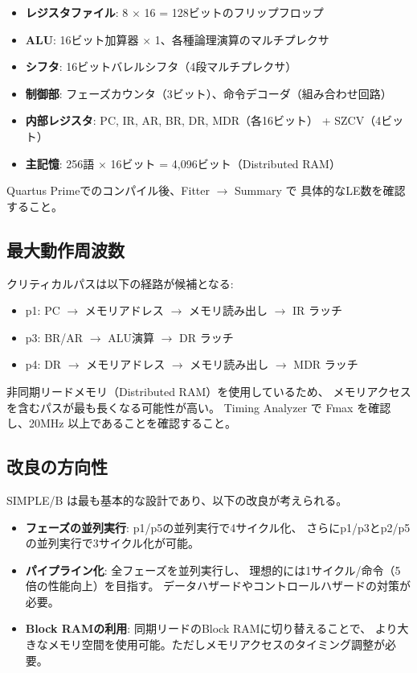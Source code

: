 \documentclass[a4paper,11pt]{ltjsarticle}
\begin{document}
\begin{itemize}
\item \textbf{レジスタファイル}: 8 $\times$ 16 = 128ビットのフリップフロップ
\item \textbf{ALU}: 16ビット加算器 $\times$ 1、各種論理演算のマルチプレクサ
\item \textbf{シフタ}: 16ビットバレルシフタ（4段マルチプレクサ）
\item \textbf{制御部}: フェーズカウンタ（3ビット）、命令デコーダ（組み合わせ回路）
\item \textbf{内部レジスタ}: PC, IR, AR, BR, DR, MDR（各16ビット） + SZCV（4ビット）
\item \textbf{主記憶}: 256語 $\times$ 16ビット = 4,096ビット（Distributed RAM）
\end{itemize}

Quartus Primeでのコンパイル後、Fitter $\rightarrow$ Summary で
具体的なLE数を確認すること。

\subsection{最大動作周波数}

クリティカルパスは以下の経路が候補となる:
\begin{itemize}
\item p1: PC $\rightarrow$ メモリアドレス $\rightarrow$ メモリ読み出し $\rightarrow$ IR ラッチ
\item p3: BR/AR $\rightarrow$ ALU演算 $\rightarrow$ DR ラッチ
\item p4: DR $\rightarrow$ メモリアドレス $\rightarrow$ メモリ読み出し $\rightarrow$ MDR ラッチ
\end{itemize}

非同期リードメモリ（Distributed RAM）を使用しているため、
メモリアクセスを含むパスが最も長くなる可能性が高い。
Timing Analyzer で Fmax を確認し、20MHz 以上であることを確認すること。

\subsection{改良の方向性}

SIMPLE/B は最も基本的な設計であり、以下の改良が考えられる。

\begin{itemize}
\item \textbf{フェーズの並列実行}: p1/p5の並列実行で4サイクル化、
  さらにp1/p3とp2/p5の並列実行で3サイクル化が可能。
\item \textbf{パイプライン化}: 全フェーズを並列実行し、
  理想的には1サイクル/命令（5倍の性能向上）を目指す。
  データハザードやコントロールハザードの対策が必要。
\item \textbf{Block RAMの利用}: 同期リードのBlock RAMに切り替えることで、
  より大きなメモリ空間を使用可能。ただしメモリアクセスのタイミング調整が必要。
\end{itemize}
\end{document}
